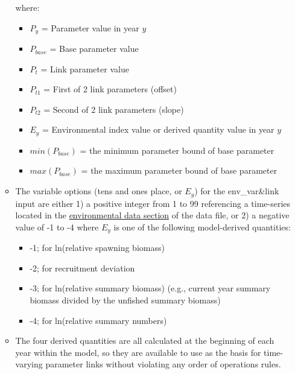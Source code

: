 \begin{itemize}
\begin{itemize}
\begin{itemize}
	   \end{itemize}
		where:
	   \begin{itemize}
	       \item $P_{y}$ = Parameter value in year $y$
           \item $P_{base}$ = Base parameter value
           \item $P_{t}$ = Link parameter value
           \item $P_{t1}$ = First of 2 link parameters (offset)
           \item $P_{t2}$ = Second of 2 link parameters (slope)
           \item $E_{y}$ = Environmental index value or derived quantity value in year $y$
           \item $min(P_{base})$ = the minimum parameter bound of base parameter
           \item $max(P_{base})$ = the maximum parameter bound of base parameter
        \end{itemize}
		\item The variable options (tens and ones place, or $E_{y}$) for the env\_var\&link input are either 1) a positive integer from 1 to 99 referencing a time-series located in the \hyperlink{env-dat}{environmental data section} of the data file, or 2) a negative value of -1 to -4 where $E_y$ is one of the following model-derived quantities:
		\begin{itemize}
			\item -1;  for ln(relative spawning biomass)
			\item -2;  for recruitment deviation
			\item -3;  for ln(relative summary biomass) (e.g., current year summary biomass divided by the unfished summary biomass)
			\item -4;  for ln(relative summary numbers)
		\end{itemize}
		\item The four derived quantities are all calculated at the beginning of each year within the model, so they are available to use as the basis for time-varying parameter links without violating any order of operations rules.
	\end{itemize}
	

\end{itemize}
